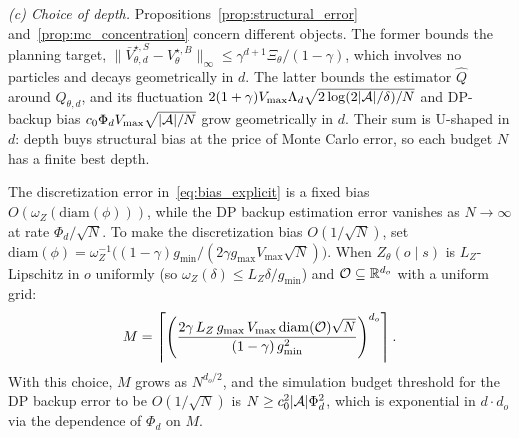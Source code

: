 \begin{rmk}
\emph{(c) Choice of depth.}
Propositions~\ref{prop:structural_error} and~\ref{prop:mc_concentration} concern different objects.
The former bounds the planning target, $\|\bar V_{\theta,d}^{\star,S}-V_\theta^{\star,B}\|_\infty\le\gamma^{d+1}\Xi_\theta/(1-\gamma)$, which involves no particles and decays geometrically in $d$.
The latter bounds the estimator $\widehat Q$ around $Q_{\theta,d}$, and its fluctuation $2(1+\gamma)V_{\max}\Lambda_d\sqrt{2\log(2|{\mathcal{A}}|/\delta)/N}$ and DP-backup bias $c_0\Phi_dV_{\max}\sqrt{|{\mathcal{A}}|/N}$ grow geometrically in $d$.
Their sum is U-shaped in $d$: depth buys structural bias at the price of Monte Carlo error, so each budget $N$ has a finite best depth.
\end{rmk}

\begin{rmk}\label{rmk:disc_resolution}
The discretization error in~\eqref{eq:bias_explicit} is a fixed bias $O(\omega_Z(\mathrm{diam}(\phi)))$, while the DP backup estimation error vanishes as $N\to\infty$ at rate $\Phi_d/\sqrt{N}$.
To make the discretization bias $O(1/\sqrt{N})$, set $\mathrm{diam}(\phi)=\omega_Z^{-1}\bigl((1-\gamma)g_{\min}/(2\gamma g_{\max}V_{\max}\sqrt{N})\bigr)$.
When $Z_\theta(o\mid s)$ is $L_Z$-Lipschitz in $o$ uniformly (so $\omega_Z(\delta)\le L_Z\delta/g_{\min}$) and ${\mathcal{O}}\subseteq{\mathbb{R}}^{d_o}$ with a uniform grid:
\begin{equation}\label{eq:M_opt}
M=\left\lceil\left(\frac{2\gamma\,L_Z\,g_{\max}\,V_{\max}\,\mathrm{diam}({\mathcal{O}})\sqrt{N}}{(1-\gamma)\,g_{\min}^2}\right)^{d_o}\right\rceil.
\end{equation}
With this choice, $M$ grows as $N^{d_o/2}$, and the simulation budget threshold for the DP backup error to be $O(1/\sqrt{N})$ is $N\ge c_0^2|{\mathcal{A}}|\Phi_d^2$, which is exponential in $d\cdot d_o$ via the dependence of $\Phi_d$ on $M$.


\end{rmk}
